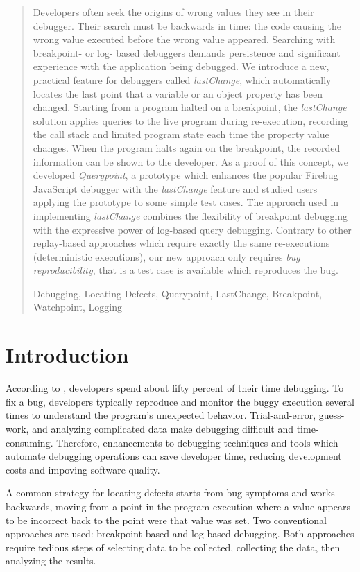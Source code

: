 \documentclass[runningheads,a4paper]{llncs}
\newcommand{\keywords}[1]{\par\addvspace\baselineskip
\noindent\keywordname\enspace\ignorespaces#1}
\begin{document}
\begin{abstract}
Developers often seek the origins of wrong values they see in their
debugger. Their search must be backwards in time: the code causing the
wrong value executed before the wrong value appeared. Searching with
breakpoint- or log- based debuggers demands persistence and
significant experience with the application being debugged. 
We introduce a new, practical feature for debuggers called \textit{lastChange}, 
which automatically locates the last point that a variable or an object property 
has been changed. Starting from a 
program halted on a breakpoint, the \textit{lastChange} solution
applies queries to the live program during re-execution, recording the call stack 
and limited program state each time the property value changes.
When the program halts again on the breakpoint, the recorded information 
can be shown to the developer.
As a proof of this concept, we developed \textit{Querypoint}, a prototype
which enhances the popular Firebug JavaScript debugger with
 the \textit{lastChange} feature and studied users applying the prototype to 
some simple test cases.
 The approach used in implementing 
\textit{lastChange} combines the flexibility of breakpoint debugging
with the expressive power of log-based query debugging.  Contrary to
other replay-based approaches which require exactly the same
re-executions (deterministic executions), our new approach only requires \textit{bug 
reproducibility}, that is a test case is available which reproduces the bug. 
  
\keywords{Debugging, Locating Defects, Querypoint, LastChange, Breakpoint,
 Watchpoint, Logging}
\end{abstract}




\section{Introduction}

According to \cite{LaToza}, developers spend about fifty percent of
their time debugging. To fix a bug, developers typically reproduce 
and monitor the buggy execution several times to understand the 
program's unexpected behavior. Trial-and-error, guess-work, and 
analyzing complicated data make debugging difficult and time-consuming. 
Therefore, enhancements to debugging techniques and tools which automate 
debugging operations can save developer 
time, reducing development costs  and impoving software quality.

A common strategy for locating defects starts from bug symptoms and
works backwards, moving from a point in the program execution where a
value appears to be incorrect back to the point were that value was
set.  Two conventional approaches are used: breakpoint-based and
log-based debugging. Both approaches require tedious steps of
selecting data to be collected, collecting the data, then analyzing
the results. 
\end{document}
